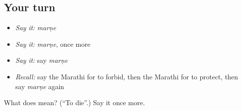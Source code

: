 \subsection*{Your turn}
\begin{itemize}
\raggedright
  \item \emph{Say it:} \emph{marṇe}
  \item \emph{Say it:} \emph{marṇe}, once more
  \item \emph{Say it:} say \emph{marṇe}
  \item \emph{Recall:} say the Marathi for to forbid, then the Marathi for to protect, then say \emph{marṇe} again
\end{itemize}

\begin{tcolorbox}[breakable,colback=teal!4,colframe=teal!35!black,title={Before you move on}]
What does  mean? (\textquotedblleft{}To die\textquotedblright{}.) Say it once more.
\end{tcolorbox}
